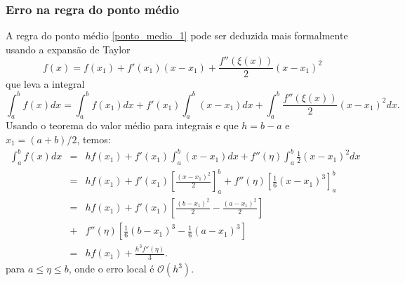 % 

\subsubsection{Erro na regra do ponto médio}
A regra do ponto médio \eqref{ponto_medio_1} pode ser deduzida mais formalmente usando a expansão de Taylor
$$
f(x)=f(x_1)+f'(x_1)(x-x_1)+\frac{f''(\xi(x))}{2}(x-x_1)^2
$$
que leva a integral
$$
\int_a^b f(x)dx=\int_a^b f(x_1) dx+f'(x_1)\int_a^b(x-x_1)dx +\int_a^b\frac{f''(\xi(x))}{2}(x-x_1)^2dx.
$$
Usando o teorema do valor médio para integrais e que $h=b-a$ e $x_1=(a+b)/2$, temos:
\begin{eqnarray*}
\int_a^b f(x)dx &=& h f(x_1) + f'(x_1)\int_a^b(x-x_1)dx+f''(\eta)\int_a^b\frac{1}{2}(x-x_1)^2dx\\
 &=& h f(x_1) +f'(x_1)\left[\frac{(x-x_1)^2}{2}\right]_a^b+f''(\eta)\left[\frac{1}{6}(x-x_1)^3\right]_a^b\\
 &=& h f(x_1) +f'(x_1)\left[\frac{(b-x_1)^2}{2}-\frac{(a-x_1)^2}{2}\right]\\
 &+& f''(\eta)\left[\frac{1}{6}(b-x_1)^3-\frac{1}{6}(a-x_1)^3\right]\\
 &=& h f(x_1) +\frac{h^3f''(\eta)}{3}.
\end{eqnarray*}
para $a\leq \eta\leq b$, onde o erro local é $\mathcal{O}(h^3)$.


